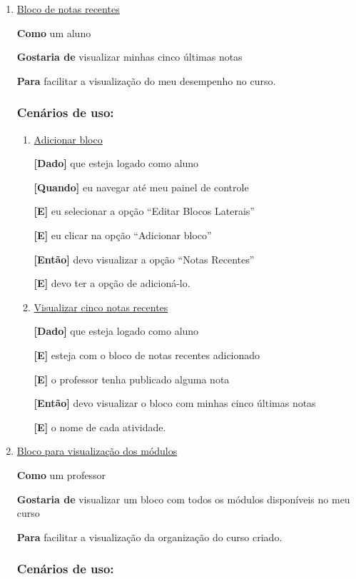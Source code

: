 \begin{enumerate}
\item \underline{Bloco de notas recentes}

\textbf{Como} um aluno

\textbf{Gostaria de} visualizar minhas cinco últimas notas

\textbf{Para} facilitar a visualização do meu desempenho no curso.

\subsubsection*{Cenários de uso:}

\begin{enumerate}

\item \underline{Adicionar bloco}

\textbf{[Dado]} que esteja logado como aluno

\textbf{[Quando]} eu navegar até meu painel de controle

\textbf{[E]} eu selecionar a opção ``Editar Blocos Laterais''

\textbf{[E]} eu clicar na opção ``Adicionar bloco''

\textbf{[Então]} devo visualizar a opção ``Notas Recentes''

\textbf{[E]} devo ter a opção de adicioná-lo.

\item \underline{Visualizar cinco notas recentes}

\textbf{[Dado]} que esteja logado como aluno

\textbf{[E]} esteja com o bloco de notas recentes adicionado

\textbf{[E]} o professor tenha publicado alguma nota

\textbf{[Então]} devo visualizar o bloco com minhas cinco últimas notas

\textbf{[E]} o nome de cada atividade.

\end{enumerate}

\item \underline{Bloco para visualização dos módulos}

\textbf{Como} um professor

\textbf{Gostaria de} visualizar um bloco com todos os módulos disponíveis no meu curso

\textbf{Para} facilitar a visualização da organização do curso criado.

\subsubsection*{Cenários de uso:}


\end{enumerate}
